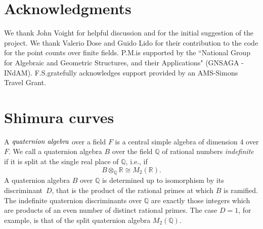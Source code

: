 \documentclass[11pt,reqno]{amsart}
\newcommand{\Q}{\mathbb{Q}}
\newcommand{\R}{\mathbb{R}}
\theoremstyle{definition}
\begin{document}
\section*{Acknowledgments}

We thank John Voight for helpful discussion and for the initial suggestion of the project. We thank Valerio Dose and Guido Lido for their contribution to the code for the point counts over finite fields. P.M.\@ is supported by the ``National Group for Algebraic and Geometric Structures, and their Applications" (GNSAGA - INdAM). F.S.\@ gratefully acknowledges support provided by an AMS-Simons Travel Grant.




\section{Shimura curves}\label{section: shimura_curves}

A $\emph{quaternion algebra}$ over a field $F$ is a central simple algebra of dimension $4$ over $F$. We call a quaternion algebra $B$ over the field $\Q$ of rational numbers \emph{indefinite} if it is split at the single real place of $\Q$, i.e., if
\[ B \otimes_\Q \R \cong M_2(\R). \]
A quaternion algebra $B$ over $\Q$ is determined up to isomorphism by its discriminant~$D$, that is the product of the rational primes at which $B$ is ramified. The indefinite quaternion discriminants over $\Q$ are exactly those integers which are products of an even number of distinct rational primes. The case $D=1$, for example, is that of the split quaternion algebra $M_2(\Q)$. 
\end{document}
